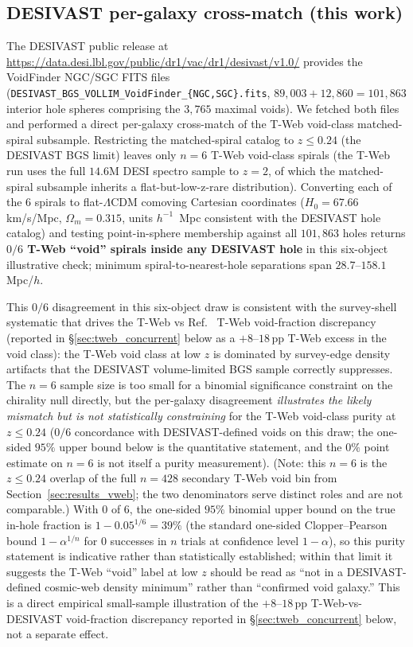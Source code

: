 \documentclass[aps,prd,twocolumn,superscriptaddress,showpacs,preprintnumbers,nofootinbib,longbibliography,floatfix]{revtex4-2}
\begin{document}
\fi
\subsection{DESIVAST per-galaxy cross-match (this work)}\label{sec:desivast_xmatch}

The DESIVAST
public release at
\url{https://data.desi.lbl.gov/public/dr1/vac/dr1/desivast/v1.0/}
provides the VoidFinder NGC/SGC FITS files
(\texttt{DESIVAST\_BGS\_VOLLIM\_VoidFinder\_\{NGC,SGC\}.fits},
$89{,}003 + 12{,}860 = 101{,}863$ interior hole spheres comprising the
$3{,}765$ maximal voids). We fetched both files and performed a direct
per-galaxy cross-match of the T-Web void-class matched-spiral
subsample. Restricting the matched-spiral catalog to $z \leq 0.24$
(the DESIVAST BGS limit) leaves only $n = 6$ T-Web void-class spirals
(the T-Web run uses the full $14.6$M DESI spectro sample to $z = 2$,
of which the matched-spiral subsample inherits a flat-but-low-z-rare
distribution). Converting each of the 6 spirals to flat-$\Lambda$CDM
comoving Cartesian coordinates ($H_0 = 67.66$ km/s/Mpc, $\Omega_m =
0.315$, units $h^{-1}$~Mpc consistent with the DESIVAST hole catalog)
and testing point-in-sphere membership against all $101{,}863$ holes
returns \textbf{$0/6$ T-Web ``void'' spirals inside any DESIVAST hole}
in this six-object illustrative check;
minimum spiral-to-nearest-hole separations span $28.7$--$158.1\,$Mpc/$h$.

This $0/6$ disagreement in this six-object draw is consistent with the survey-shell systematic
that drives the T-Web vs Ref.~\cite{TWebDESI2026} T-Web void-fraction discrepancy
(reported in \S\ref{sec:tweb_concurrent} below as a
$+8$--$18\,$pp T-Web excess in the void class):
the T-Web void class at low $z$ is dominated by
survey-edge density artifacts that the DESIVAST volume-limited BGS
sample correctly suppresses. The $n = 6$ sample size is too small for
a binomial significance constraint on the chirality null directly, but
the per-galaxy disagreement \emph{illustrates the likely mismatch but is
not statistically constraining} for the T-Web void-class purity at
$z \leq 0.24$ ($0/6$ concordance with DESIVAST-defined voids on this
draw; the one-sided $95\%$ upper bound below is the quantitative
statement, and the $0\%$ point estimate on $n=6$ is not itself a purity
measurement). (Note: this $n=6$ is the $z \leq 0.24$ overlap of the full
$n=428$ secondary T-Web void bin from
Section~\ref{sec:results_vweb}; the two denominators serve distinct
roles and are not comparable.) With $0$ of $6$, the one-sided $95\%$ binomial upper bound on
the true in-hole fraction is $1 - 0.05^{1/6} = 39\%$ (the standard
one-sided Clopper--Pearson bound $1 - \alpha^{1/n}$ for $0$ successes in
$n$ trials at confidence level $1-\alpha$), so this purity
statement is indicative rather than statistically established;
within that limit it suggests the T-Web ``void'' label at low $z$
should be read as ``not in a DESIVAST-defined cosmic-web density
minimum'' rather than ``confirmed void galaxy.''
This is a direct empirical small-sample illustration of the
$+8$--$18\,$pp T-Web-vs-DESIVAST void-fraction discrepancy
reported in \S\ref{sec:tweb_concurrent} below,
not a separate effect.
\end{document}
